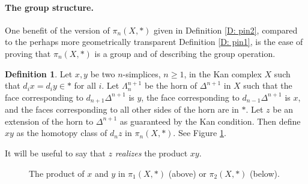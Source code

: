 \documentclass[12pt]{article}
\theoremstyle{plain}
\theoremstyle{definition}
\newtheorem{definition}[theorem]{Definition}
\begin{document}
\paragraph{The group structure.}

One benefit of the version of $\pi_n(X,*)$ given in Definition \ref{D: pin2}, compared to the perhaps more geometrically transparent Definition \ref{D: pin1}, is the ease of  proving that $\pi_n(X,*)$ is a group and of describing the group operation.

\begin{definition}\label{D: pi product}
Let $x,y$ be two $n$-simplices, $n\geq 1$, in the Kan complex $X$ such that $d_ix=d_iy\in *$ for all $i$. Let $\Lambda^{n+1}_n$ be the horn of $\Delta^{n+1}$ in $X$ such that the face corresponding to $d_{n+1}\Delta^{n+1}$ is $y$, the face corresponding to $d_{n-1}\Delta^{n+1}$ is $x$, and the faces corresponding to all other sides of the horn are in $*$. Let $z$ be an extension of the horn to $\Delta^{n+1}$ as guaranteed by the Kan condition. Then define $xy$ as the homotopy class of $d_nz$ in $\pi_n(X,*)$. See Figure \ref{F: fig26}.

It will be useful to say that $z$ \emph{realizes} the product $xy$. 
\end{definition}



\begin{figure}[!htp]
\begin{center}
\end{center}
\caption{The product of $x$ and $y$ in $\pi_1(X,*)$ (above) or $\pi_2(X,*)$ (below).}\label{F: fig26}
\end{figure}
\end{document}
